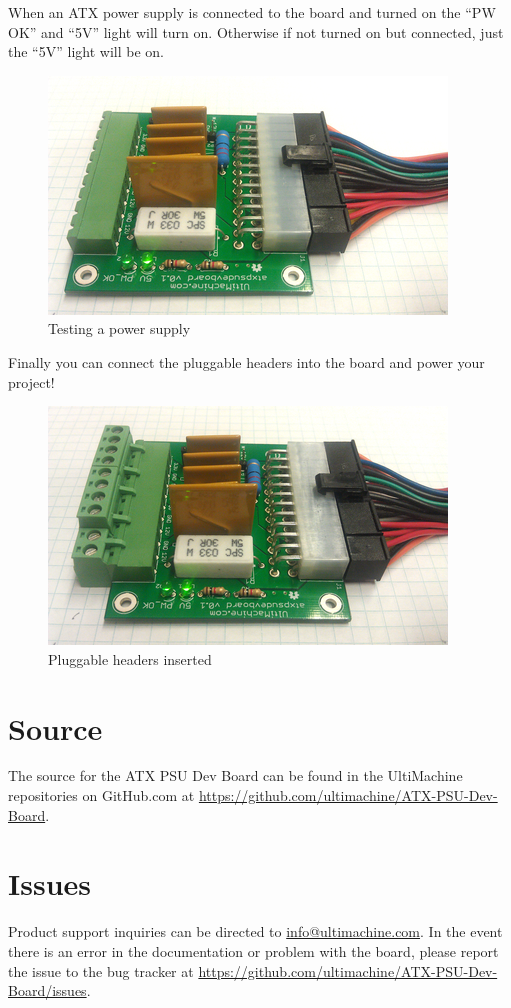When an ATX power supply is connected to the board and turned on the
``PW OK'' and ``5V'' light will turn on. Otherwise if not turned on but
connected, just the ``5V'' light will be on.

\begin{figure}[H]
\centering
\includegraphics{./png/step-11.png}
\caption{Testing a power supply}
\end{figure}

Finally you can connect the pluggable headers into the board and power
your project!

\begin{figure}[H]
\centering
\includegraphics{./png/step-12.png}
\caption{Pluggable headers inserted}
\end{figure}

\section{Source}

The source for the ATX PSU Dev Board can be found in the UltiMachine
repositories on GitHub.com at
\url{https://github.com/ultimachine/ATX-PSU-Dev-Board}.

\section{Issues}

Product support inquiries can be directed to
\href{mailto:info@ultimachine.com}{info@ultimachine.com}. In the event
there is an error in the documentation or problem with the board, please
report the issue to the bug tracker at
\url{https://github.com/ultimachine/ATX-PSU-Dev-Board/issues}.
